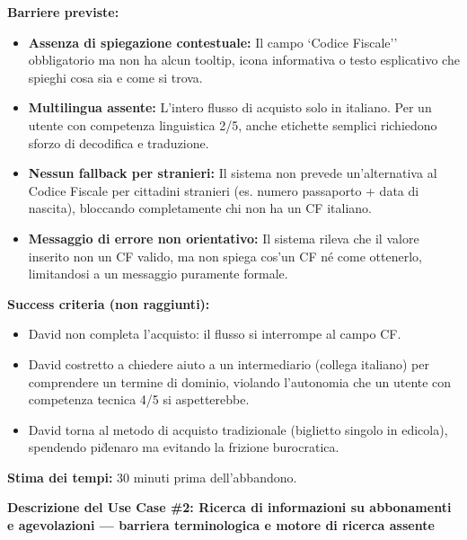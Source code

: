 \documentclass[11pt,a4paper]{article}
\begin{document}
\begin{tcolorbox}[colback=backgroundColor,colframe=borderColor,arc=2mm]
{    \textbf{Barriere previste:}
    \begin{itemize}
        \item \textbf{Assenza di spiegazione contestuale:} Il campo `Codice Fiscale'' \e obbligatorio ma non ha alcun tooltip, icona informativa o testo esplicativo che spieghi cosa sia e come si trova.
        \item \textbf{Multilingua assente:} L'intero flusso di acquisto \e solo in italiano. Per un utente con competenza linguistica 2/5, anche etichette semplici richiedono sforzo di decodifica e traduzione.
        \item \textbf{Nessun fallback per stranieri:} Il sistema non prevede un'alternativa al Codice Fiscale per cittadini stranieri (es. numero passaporto + data di nascita), bloccando completamente chi non ha un CF italiano.
        \item \textbf{Messaggio di errore non orientativo:} Il sistema rileva che il valore inserito non \e un CF valido, ma non spiega cos'\e un CF n\'e come ottenerlo, limitandosi a un messaggio puramente formale.
    \end{itemize}

    \textbf{Success criteria (non raggiunti):}
    \begin{itemize}
        \item David non completa l'acquisto: il flusso si interrompe al campo CF.
        \item David \e costretto a chiedere aiuto a un intermediario (collega italiano) per comprendere un termine di dominio, violando l'autonomia che un utente con competenza tecnica 4/5 si aspetterebbe.
        \item David torna al metodo di acquisto tradizionale (biglietto singolo in edicola), spendendo pi\u denaro ma evitando la frizione burocratica.
    \end{itemize}

    \textbf{Stima dei tempi:} 30 minuti prima dell'abbandono.
    }
\end{tcolorbox}

\newpage


\begin{tcolorbox}[colback=primaryColor!10,colframe=primaryColor,arc=2mm]
    \textbf{Descrizione del Use Case \#2: Ricerca di informazioni su abbonamenti e agevolazioni --- barriera terminologica e motore di ricerca assente}
\end{tcolorbox}
\end{document}
